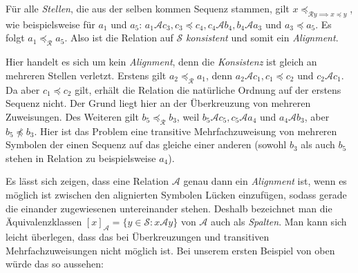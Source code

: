 \begin{beispiel}
	\begin{center}
	\end{center}
	Für alle \emph{Stellen}, die aus der selben kommen Sequenz stammen, gilt $x \preceq_{\mathcal{R} y \implies x \preceq y}$, wie beispielsweise für $a_1$ und $a_5$: $a_1 \mathcal{A} c_3, c_3 \preceq c_4, c_4 \mathcal{A} b_4, b_4 \mathcal{A} a_3$ und $a_3 \preceq a_5$. Es folgt $a_1 \preceq_{\mathcal{R}} a_5$. Also ist die Relation auf $\mathcal{S}$ \emph{konsistent} und somit ein \emph{Alignment}.
	
	\begin{center}
	\end{center}
	Hier handelt es sich um kein \emph{Alignment}, denn die \emph{Konsistenz} ist gleich an mehreren Stellen verletzt. Erstens gilt $a_2 \preceq_{\mathcal{R}} a_1$, denn $a_2 \mathcal{A} c_1, c_1 \preceq c_2$ und $c_2 \mathcal{A} c_1$. Da aber $c_1 \preceq c_2$ gilt, erhält die Relation die natürliche Ordnung auf der erstens Sequenz nicht. Der Grund liegt hier an der Überkreuzung von mehreren Zuweisungen. Des Weiteren gilt $b_5 \preceq_{\mathcal{R}} b_3$, weil $b_5 \mathcal{A} c_5, c_5 \mathcal{A} a_4$ und $a_4 \mathcal{A} b_3$, aber $b_5 \npreceq b_3$. Hier ist das Problem eine transitive Mehrfachzuweisung von mehreren Symbolen der einen Sequenz auf das gleiche einer anderen (sowohl $b_3$ als auch $b_5$ stehen in Relation zu beispielsweise $a_4$). 
\end{beispiel}

Es lässt sich zeigen, dass eine Relation $\mathcal{A}$ genau dann ein \emph{Alignment} ist, wenn es möglich ist zwischen den alignierten Symbolen Lücken einzufügen, sodass gerade die einander zugewiesenen untereinander stehen. Deshalb bezeichnet man die Äquivalenzklassen $[x]_{\mathcal{A}} = \{y \in \mathcal{S} \colon x\mathcal{A}y \}$ von $\mathcal{A}$ auch als \emph{Spalten}. Man kann sich leicht überlegen, dass das bei Überkreuzungen und transitiven Mehrfachzuweisungen nicht möglich ist. Bei unserem ersten Beispiel von oben würde das so aussehen:

